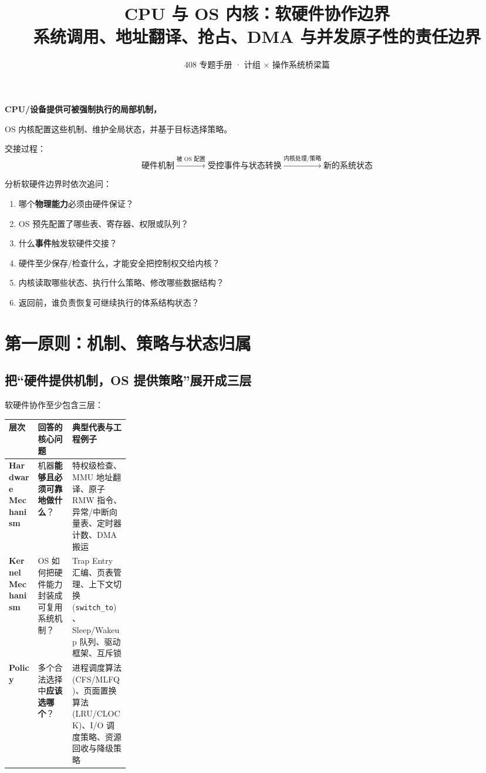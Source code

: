 \documentclass[11pt,a4paper]{ctexart}
\title{\vspace{-1.2cm}\textbf{CPU 与 OS 内核：软硬件协作边界}\\[0.35em]
\large 系统调用、地址翻译、抢占、DMA 与并发原子性的责任边界}
\author{408 专题手册 · 计组 × 操作系统桥梁篇}
\date{}
\newcommand{\kw}[1]{\textbf{#1}}
\newcommand{\code}[1]{\texttt{#1}}
\begin{document}
\maketitle

\begin{corebox}
\begin{center}
\Large\bfseries CPU/设备提供可被强制执行的局部机制，\par
OS 内核配置这些机制、维护全局状态，并基于目标选择策略。
\end{center}

交接过程：
\[
\boxed{
\text{硬件机制}
\xrightarrow{\text{被 OS 配置}}
\text{受控事件与状态转换}
\xrightarrow{\text{内核处理/策略}}
\text{新的系统状态}
}
\]

分析软硬件边界时依次追问：
\begin{enumerate}
  \item 哪个\kw{物理能力}必须由硬件保证？
  \item OS 预先配置了哪些表、寄存器、权限或队列？
  \item 什么\kw{事件}触发软硬件交接？
  \item 硬件至少保存/检查什么，才能安全把控制权交给内核？
  \item 内核读取哪些状态、执行什么策略、修改哪些数据结构？
  \item 返回前，谁负责恢复可继续执行的体系结构状态？
\end{enumerate}
\end{corebox}

\tableofcontents
\newpage

\section{第一原则：机制、策略与状态归属}

\subsection{把“硬件提供机制，OS 提供策略”展开成三层}
软硬件协作至少包含三层：

\begingroup
\small
\renewcommand{\arraystretch}{1.25}
\setlength{\tabcolsep}{6pt}
\begin{tabularx}{\linewidth}{>{\bfseries}p{0.24\linewidth} X X}
\toprule
层次 & 回答的核心问题 & 典型代表与工程例子\\
\midrule
Hardware Mechanism & 机器\kw{能够且必须可靠地做什么}？ & 特权级检查、MMU 地址翻译、原子 RMW 指令、异常/中断向量表、定时器计数、DMA 搬运\\
Kernel Mechanism & OS 如何把硬件能力封装成可复用系统机制？ & Trap Entry 汇编、页表管理、上下文切换 (\code{switch\_to})、Sleep/Wakeup 队列、驱动框架、互斥锁\\
Policy & 多个合法选择中\kw{应该选哪个}？ & 进程调度算法 (CFS/MLFQ)、页面置换算法 (LRU/CLOCK)、I/O 调度策略、资源回收与降级策略\\
\bottomrule
\end{tabularx}
\endgroup
\end{document}

